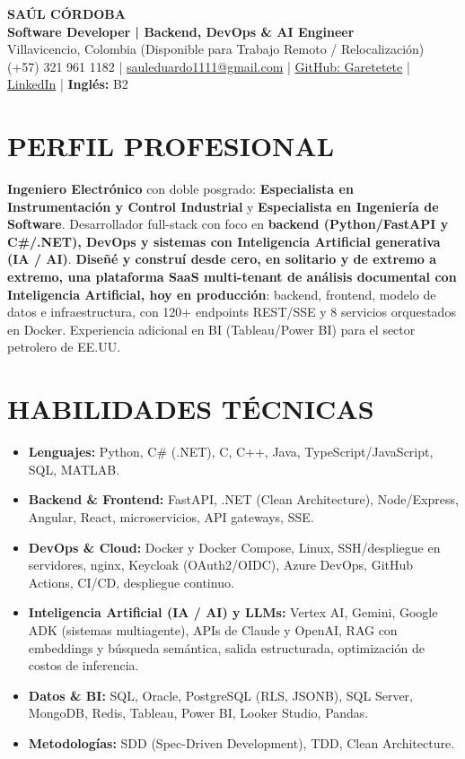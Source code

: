 \documentclass[letterpaper,10pt]{article}
\begin{document}
\begin{center}
    {\Huge \bfseries SAÚL CÓRDOBA} \\[3pt]
    {\Large \textbf{Software Developer | Backend, DevOps \& AI Engineer}} \\[2pt]
    Villavicencio, Colombia (Disponible para Trabajo Remoto / Relocalización) \\
    (+57) 321 961 1182 | \href{mailto:sauleduardo1111@gmail.com}{sauleduardo1111@gmail.com} | \href{https://github.com/Garetetete}{GitHub: Garetetete} | \href{https://www.linkedin.com/in/saul-cordoba-a2997427b}{LinkedIn} | \textbf{Inglés:} B2
\end{center}

\section{PERFIL PROFESIONAL}
\textbf{Ingeniero Electrónico} con doble posgrado: \textbf{Especialista en Instrumentación y Control Industrial} y \textbf{Especialista en Ingeniería de Software}. Desarrollador full-stack con foco en \textbf{backend (Python/FastAPI y C\#/.NET), DevOps y sistemas con Inteligencia Artificial generativa (IA / AI)}. \textbf{Diseñé y construí desde cero, en solitario y de extremo a extremo, una plataforma SaaS multi-tenant de análisis documental con Inteligencia Artificial, hoy en producción}: backend, frontend, modelo de datos e infraestructura, con 120+ endpoints REST/SSE y 8 servicios orquestados en Docker. Experiencia adicional en BI (Tableau/Power BI) para el sector petrolero de EE.UU.

\section{HABILIDADES TÉCNICAS}
\begin{itemize}
    \item \textbf{Lenguajes:} Python, C\# (.NET), C, C++, Java, TypeScript/JavaScript, SQL, MATLAB.
    \item \textbf{Backend \& Frontend:} FastAPI, .NET (Clean Architecture), Node/Express, Angular, React, microservicios, API gateways, SSE.
    \item \textbf{DevOps \& Cloud:} Docker y Docker Compose, Linux, SSH/despliegue en servidores, nginx, Keycloak (OAuth2/OIDC), Azure DevOps, GitHub Actions, CI/CD, despliegue continuo.
    \item \textbf{Inteligencia Artificial (IA / AI) y LLMs:} Vertex AI, Gemini, Google ADK (sistemas multiagente), APIs de Claude y OpenAI, RAG con embeddings y búsqueda semántica, salida estructurada, optimización de costos de inferencia.
    \item \textbf{Datos \& BI:} SQL, Oracle, PostgreSQL (RLS, JSONB), SQL Server, MongoDB, Redis, Tableau, Power BI, Looker Studio, Pandas.
    \item \textbf{Metodologías:} SDD (Spec-Driven Development), TDD, Clean Architecture.
\end{itemize}
\end{document}
